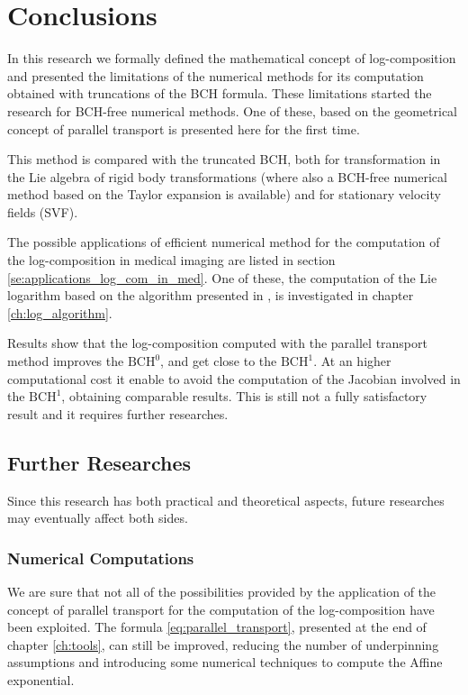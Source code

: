\section{Conclusions}\label{se:conclusions}

In this research we formally defined the mathematical concept of log-composition and presented the limitations of the numerical methods for its computation obtained with truncations of the BCH formula. These limitations started the research for BCH-free numerical methods. 
One of these, based on the geometrical concept of parallel transport is presented here for the first time.

This method is compared with the truncated BCH, both for transformation in the Lie algebra of rigid body transformations (where also a BCH-free numerical method based on the Taylor expansion is available) and for stationary velocity fields (SVF).

The possible applications of efficient numerical method for the computation of the log-composition in medical imaging are listed in section \ref{se:applications_log_com_in_med}. One of these, the computation of the Lie logarithm based on the algorithm presented in \cite{bossa2008new}, is investigated in chapter \ref{ch:log_algorithm}.

Results show that the log-composition computed with the parallel transport method improves the $\text{BCH}^0$, and get close to the $\text{BCH}^1$. At an higher computational cost it enable to avoid the computation of the Jacobian involved in the $\text{BCH}^1$, obtaining comparable results. This is still not a fully satisfactory result and it requires further researches.


\subsection{Further Researches}\label{se:further_research}

Since this research has both practical and theoretical aspects, future researches may eventually affect both sides.

\subsubsection{Numerical Computations} 

We are sure that not all of the possibilities provided by the application of the concept of parallel transport for the computation of the log-composition have been exploited. The formula \ref{eq:parallel_transport}, presented at the end of chapter \ref{ch:tools}, can still be improved, reducing the number of underpinning assumptions and introducing some numerical techniques to compute the Affine exponential.\\

